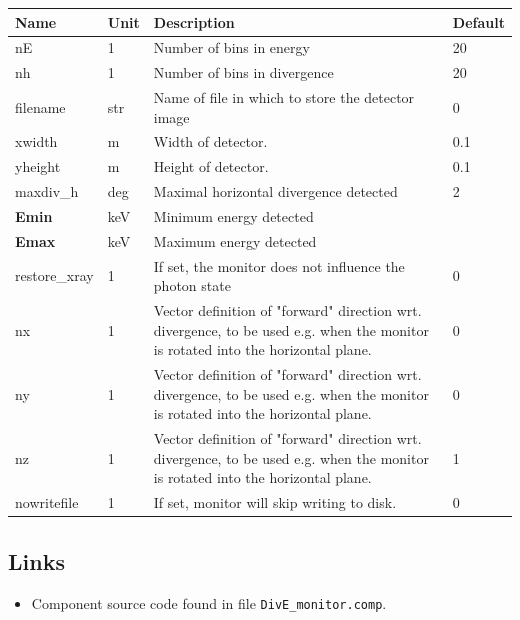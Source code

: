 \begin{longtable}{p{}p{}p{}p{}}
\toprule
\textbf{Name} & \textbf{Unit} & \textbf{Description} & \textbf{Default} \\
\midrule
\endhead
nE & 1 & Number of bins in energy & 20 \\
nh & 1 & Number of bins in divergence & 20 \\
filename & str & Name of file in which to store the detector image & 0 \\
xwidth & m & Width of detector. & 0.1 \\
yheight & m & Height of detector. & 0.1 \\
maxdiv\_h & deg & Maximal horizontal divergence detected & 2 \\
\textbf{Emin} & keV & Minimum energy detected &  \\
\textbf{Emax} & keV & Maximum energy detected &  \\
restore\_xray & 1 & If set, the monitor does not influence the photon state & 0 \\
nx & 1 & Vector definition of "forward" direction wrt. divergence, to be used e.g. when the monitor is rotated into the horizontal plane. & 0 \\
ny & 1 & Vector definition of "forward" direction wrt. divergence, to be used e.g. when the monitor is rotated into the horizontal plane. & 0 \\
nz & 1 & Vector definition of "forward" direction wrt. divergence, to be used e.g. when the monitor is rotated into the horizontal plane. & 1 \\
nowritefile & 1 & If set, monitor will skip writing to disk. & 0 \\
\bottomrule
\end{longtable}

\subsection*{Links}
\begin{itemize}
  \item Component source code found in file \texttt{DivE\_monitor.comp}.
\end{itemize}
